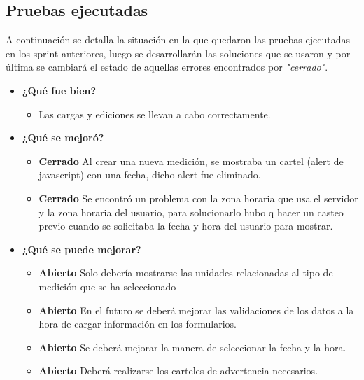 \documentclass[a4paper,12pt]{article}
\begin{document}

\subsection{Pruebas ejecutadas}
A continuación se detalla la situación en la que quedaron las pruebas ejecutadas en los sprint anteriores, luego se desarrollarán las soluciones que se usaron y por última se cambiará el estado de aquellas errores encontrados por \textit{"cerrado"}.
	\begin{itemize}
		\item \textbf{¿Qué fue bien?}
        	\begin{itemize}
				\item        Las cargas y ediciones se llevan a cabo correctamente.
			\end{itemize}

   		\item \textbf{¿Qué se mejoró?}
        	\begin{itemize}
				\item \textbf{Cerrado} Al crear una nueva medición, se mostraba un cartel (alert de javascript) con una fecha, dicho alert fue eliminado.
                \item \textbf{Cerrado} Se encontró un problema con la zona horaria que usa el servidor y la zona horaria del usuario, para solucionarlo hubo q hacer un casteo previo cuando se solicitaba la fecha y hora del usuario para mostrar.
			\end{itemize}

   		\item \textbf{¿Qué se puede mejorar?}
        	\begin{itemize}
		        \item \textbf{Abierto} Solo debería mostrarse las unidades relacionadas al tipo de medición que se ha seleccionado 
				\item \textbf{Abierto} En el futuro se deberá mejorar las validaciones de los datos a la hora de cargar información en los formularios.
        		\item \textbf{Abierto} Se deberá mejorar la manera de seleccionar la fecha y la hora. 
                \item \textbf{Abierto} Deberá realizarse los carteles de advertencia necesarios.
            \end{itemize}
       
	\end{itemize}
\end{document}
